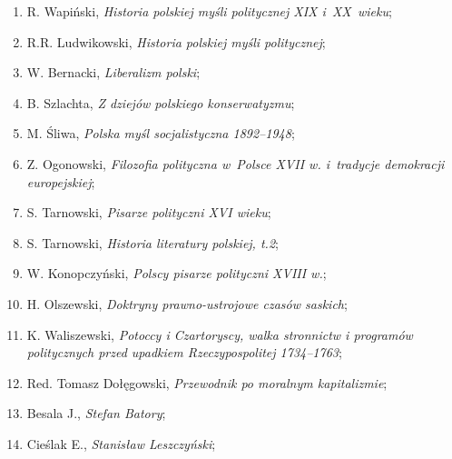 \documentclass[a4paper,11pt]{article}
\begin{document}
\begin{enumerate}
\item R. Wapiński, \textit{Historia polskiej myśli politycznej XIX
    i~XX~wieku};



\item R.R. Ludwikowski, \textit{Historia polskiej myśli politycznej};



\item W. Bernacki, \textit{Liberalizm polski};



\item B. Szlachta, \textit{Z dziejów polskiego konserwatyzmu};



\item M. Śliwa, \textit{Polska myśl socjalistyczna 1892--1948};



\item Z. Ogonowski, \textit{Filozofia polityczna w~Polsce XVII w.
    i~tradycje demokracji europejskiej};



\item S. Tarnowski, \textit{Pisarze polityczni XVI wieku};



\item S. Tarnowski, \textit{Historia literatury polskiej, t.2};



\item W. Konopczyński, \textit{Polscy pisarze polityczni XVIII w.};



\item H. Olszewski, \textit{Doktryny prawno-ustrojowe czasów saskich};



\item K. Waliszewski, \textit{Potoccy i Czartoryscy, walka stronnictw i
    programów politycznych przed upadkiem Rzeczypospolitej 1734--1763};



\item Red. Tomasz Dołęgowski, \textit{Przewodnik po moralnym
    kapitalizmie};



\item Besala J., \textit{Stefan Batory};



\item Cieślak E., \textit{Stanisław Leszczyński};




\end{enumerate}
\end{document}
